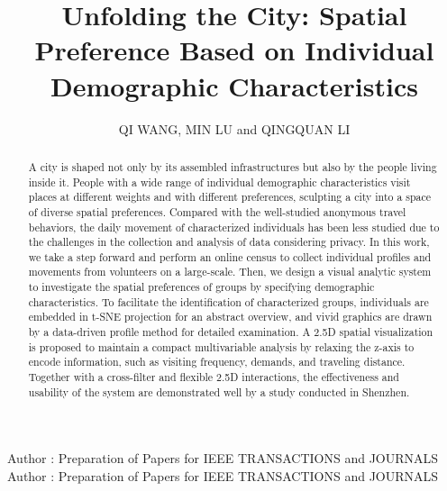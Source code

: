 \documentclass{ieeeaccess}
\begin{document}

\title{Unfolding the City: Spatial Preference Based on Individual Demographic Characteristics}


\author{\uppercase{Qi wang}, \uppercase{min lu} and \uppercase{Qingquan Li}}
\address[1]{State Key Laboratory of Information Engineering in Surveying, Mapping and Remote Sensing, Wuhan University, Wuhan 430072, China}
\address[2]{Shenzhen Key Laboratory of Spatial Smart Sensing and Services, Shenzhen University, Shenzhen 518060, China}
\address[3]{School of Architecture and Urban Planning, Shenzhen University, Shenzhen 518060, China}



\markboth
{Author \headeretal: Preparation of Papers for IEEE TRANSACTIONS and JOURNALS}
{Author \headeretal: Preparation of Papers for IEEE TRANSACTIONS and JOURNALS}


\begin{abstract}
A city is shaped not only by its assembled infrastructures but also by the people living inside it. People with a wide range of individual demographic characteristics visit places at different weights and with different preferences, sculpting a city into a space of diverse spatial preferences. Compared with the well-studied anonymous travel behaviors, the daily movement of characterized individuals has been less studied due to the challenges in the collection and analysis of data considering privacy. In this work, we take a step forward and perform an online census to collect individual profiles and movements from volunteers on a large-scale. Then, we design a visual analytic system to investigate the spatial preferences of groups by specifying demographic characteristics. To facilitate the identification of characterized groups, individuals are embedded in t-SNE projection for an abstract overview, and vivid graphics are drawn by a data-driven profile method for detailed examination. A 2.5D spatial visualization is proposed to maintain a compact multivariable analysis by relaxing the z-axis to encode information, such as visiting frequency, demands, and traveling distance. Together with a cross-filter and flexible 2.5D interactions, the effectiveness and usability of the system are demonstrated well by a study conducted in Shenzhen.\end{abstract}
\end{document}

